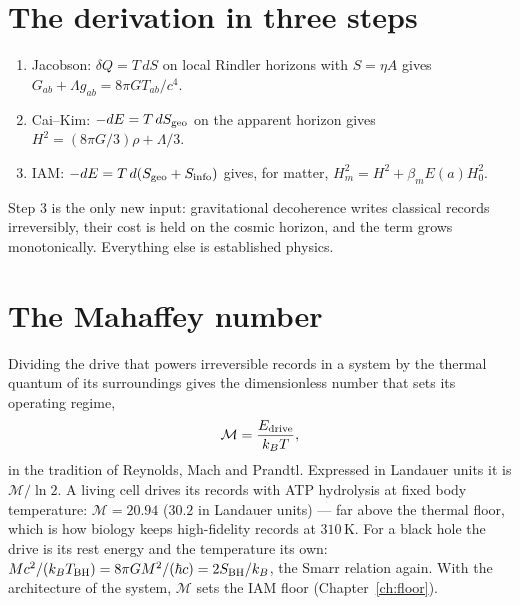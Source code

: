 \section{The derivation in three steps}
\begin{enumerate}
\item Jacobson: $\delta Q=T\,dS$ on local Rindler horizons with $S=\eta A$ gives $G_{ab}+\Lambda g_{ab}=8\pi GT_{ab}/c^4$.
\item Cai--Kim: $-dE=T\,dS_{\rm geo}$ on the apparent horizon gives $H^2=(8\pi G/3)\rho+\Lambda/3$.
\item IAM: $-dE=T\,d(S_{\rm geo}+S_{\rm info})$ gives, for matter, $H_m^2=H^2+\beta_mE(a)H_0^2$.
\end{enumerate}
Step 3 is the only new input: gravitational decoherence writes classical records irreversibly, their cost is held on the cosmic horizon, and the term
grows monotonically. Everything else is established physics.

\section{The Mahaffey number}
Dividing the drive that powers irreversible records in a system by the thermal quantum of its surroundings gives the dimensionless number that sets its
operating regime,
\begin{equation}
\mathcal M=\frac{E_{\rm drive}}{k_BT},
\end{equation}
in the tradition of Reynolds, Mach and Prandtl. Expressed in Landauer units it is $\mathcal M/\ln2$. A living cell drives its records with ATP hydrolysis at
fixed body temperature: $\mathcal M=20.94$ ($30.2$ in Landauer units) --- far above the thermal floor, which is how biology keeps high-fidelity records at
$310$\,K. For a black hole the drive is its rest energy and the temperature its own: $Mc^2/(k_BT_{\rm BH})=8\pi GM^2/(\hbar c)=2S_{\rm BH}/k_B$, the Smarr
relation again. With the architecture of the system, $\mathcal M$ sets the IAM floor (Chapter~\ref{ch:floor}).

